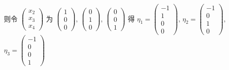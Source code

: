 \begin{enumerate}
                   则令 \( \begin{pmatrix}
                       x_{2} \\
                       x_{3} \\
                       x_{4}
                   \end{pmatrix} \) 为 \( \begin{pmatrix}
                       1 \\
                       0 \\
                       0
                   \end{pmatrix} \), \( \begin{pmatrix}
                       0 \\
                       1 \\
                       0
                   \end{pmatrix} \), \( \begin{pmatrix}
                       0 \\
                       0 \\
                       1
                   \end{pmatrix} \) 得 \( \eta_{1} = \begin{pmatrix}
                       -1 \\
                       1  \\
                       0  \\
                       0
                   \end{pmatrix} \), \( \eta_{2} = \begin{pmatrix}
                       -1 \\
                       0  \\
                       1  \\
                       0
                   \end{pmatrix} \), \( \eta_{3} = \begin{pmatrix}
                       -1 \\
                       0  \\
                       0  \\
                       1
                   \end{pmatrix} \)


\end{enumerate}
